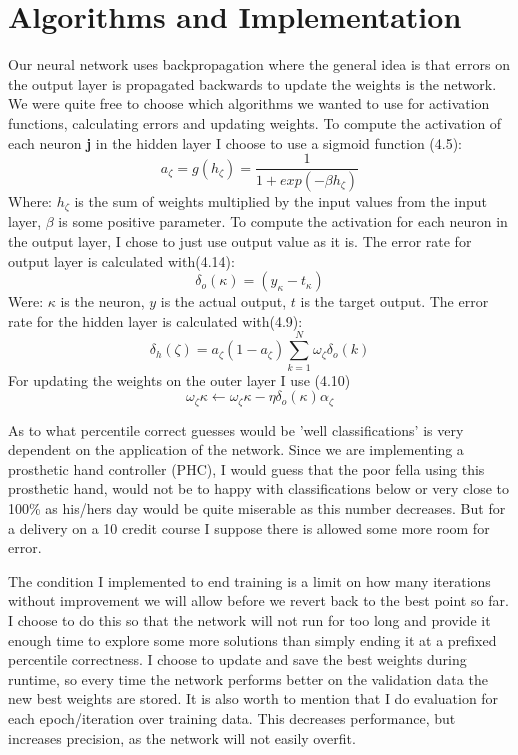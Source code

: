 \documentclass[a4paper, norsk, 12pt]{article}
\begin{document}
\section{Algorithms and Implementation}
Our neural network uses backpropagation where the general idea is that errors on the output layer is propagated backwards to update the weights is the network. We were quite free to choose which algorithms we wanted to use for activation functions, calculating errors and updating weights. To compute the activation of each neuron \textbf{j} in the hidden layer I choose to use a sigmoid function (4.5):
$$ a_ \zeta  =  g(h_\zeta) = \frac{\mathrm{1} }{\mathrm{1} + exp(- \beta h_\zeta ) }  $$
Where: \newline
$h_\zeta$ is the sum of weights multiplied by the input values from the input layer, \newline$\beta$ is some positive parameter.\newline \newline
\noindent To compute the activation for each neuron in the output layer, I chose to just use output value as it is.\newline
The error rate for output layer is calculated with(4.14):
$$ \delta_o(\kappa) = (y_\kappa - t_\kappa) $$
Were: \newline
$\kappa$ is the neuron,\newline
$y$ is the actual output,\newline
$t$ is the target output.\newline
The error rate for the hidden layer is calculated with(4.9):
$$ \delta_h(\zeta) = a_\zeta(1-a_\zeta)\sum_{k=1}^N \omega_\zeta\delta_o(k) $$
For updating the weights on the outer layer I use (4.10)
$$ \omega_\zeta\kappa \leftarrow \omega_\zeta\kappa - \eta\delta_o (\kappa)\alpha_\zeta  $$
\newline

\noindent As to what percentile correct guesses would be 'well classifications' is very dependent on the application of the network. Since we are implementing a prosthetic hand controller (PHC), I would guess that the poor fella using this prosthetic hand, would not be to happy with classifications below or very close to 100\% as his/hers day would be quite miserable as this number decreases. But for a delivery on a 10 credit course I suppose there is allowed some more room for error.\newline\newline

\noindent The condition I implemented to end training is a limit on how many iterations without improvement we will allow before we revert back to the best point so far. I choose to do this so that the network will not run for too long and provide it enough time to explore some more solutions than simply ending it at a prefixed percentile correctness. I choose to update and save the best weights during runtime, so every time the network performs better on the validation data the new best weights are stored. It is also worth to mention that I do evaluation for each epoch/iteration over training data. This decreases performance, but increases precision, as the network will not easily overfit.\newpage
\end{document}
